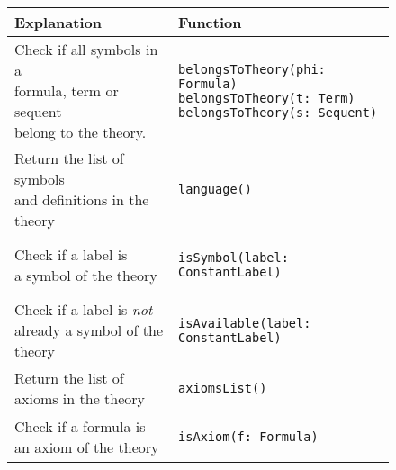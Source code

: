 {    \begin{figure}[hp]
      \begin{center}
        \begin{tabular}{l|l}
          Explanation & Function
          \\ \hline

          \makecell[l]{Check if all symbols in a        \\formula, term or sequent\\belong to the theory.} &
          \begin{lstlisting}
belongsToTheory(phi: Formula)
belongsToTheory(t: Term)
belongsToTheory(s: Sequent)
\end{lstlisting}
          \\ %

          \makecell[l]{Return the list of symbols       \\and definitions in the theory} &
          \begin{lstlisting}
language()
\end{lstlisting}
          \\ %

          \makecell[l]{Check if a label is              \\a symbol of the theory} &
          \begin{lstlisting}
isSymbol(label: ConstantLabel)
\end{lstlisting}
          \\ %

          \makecell[l]{Check if a label is \textit{not} \\already a symbol of the theory} &
          \begin{lstlisting}
isAvailable(label: ConstantLabel)
\end{lstlisting}
          \\ %

          \makecell[l]{Return the list of               \\axioms in the theory} &
          \begin{lstlisting}
axiomsList()
\end{lstlisting}
          \\ %

          \makecell[l]{Check if a formula is            \\an axiom of the theory} &
          \begin{lstlisting}
isAxiom(f: Formula)
\end{lstlisting}
          \\ %


\end{tabular}
\end{center}
\end{figure}}
